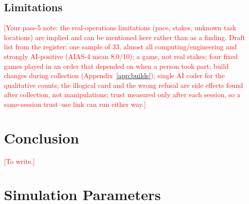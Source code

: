 \documentclass[10pt]{article}
\theoremstyle{definition}
\newcommand{\todo}[1]{\textcolor{red}{[#1]}}
\begin{document}
\subsection{Limitations}
\todo{Your pass-5 note: the real-operations limitations (pace, stakes, unknown task locations) are implied and can be
mentioned here rather than as a finding. Draft list from the register: one sample of 33, almost all computing/engineering and strongly AI-positive
(AIAS-4 mean 8.0/10); a game, not real stakes; four fixed games played in an order that depended on when a person took
part; build changes during collection (Appendix~\ref{app:builds}); single AI coder for the qualitative counts; the
illogical card and the wrong refusal are side effects found after collection, not manipulations; trust measured only
after each session, so a same-session trust--use link can run either way.}

\section{Conclusion}\label{sec:conclusion}
\todo{To write.}




\appendix

\section{Simulation Parameters}\label{app:params}
\end{document}

